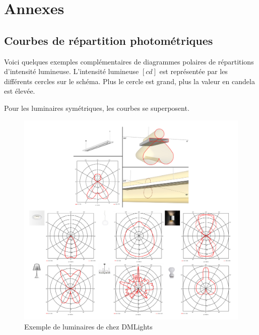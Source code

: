 \documentclass[11pt]{report}
\begin{document}
\chapter{Annexes}
\section{Courbes de répartition photométriques}
\label{an1}
Voici quelques exemples complémentaires de diagrammes polaires de répartitions d'intensité lumineuse. L'intensité lumineuse $[cd]$ est représentée par les différents cercles sur le schéma. Plus le cercle est grand, plus la valeur en candela est élevée.

Pour les luminaires symétriques, les courbes se superposent.

\begin{figure}[h]
\centering
\includegraphics[width=\linewidth]{luminaires}
\caption{Exemple de luminaires de chez DMLights}
\end{figure}


\end{document}
